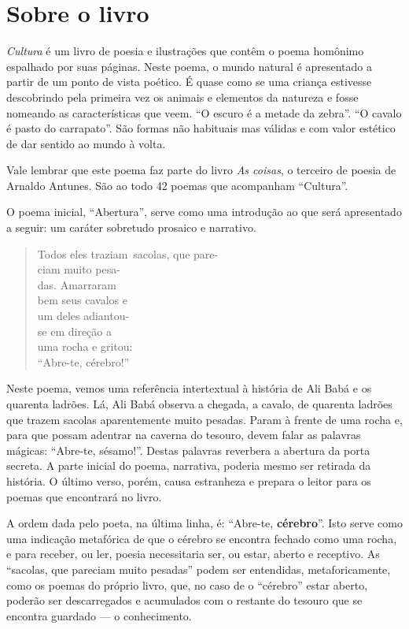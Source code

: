 \documentclass[11pt]{extarticle}
\begin{document}
\section{Sobre o livro}

\textit{Cultura} é um livro de poesia e ilustrações que contêm o 
poema homônimo espalhado por suas páginas.
Neste poema, o mundo natural é apresentado a partir de um
ponto de vista poético. É quase como se uma criança
estivesse descobrindo pela primeira vez os animais e 
elementos da natureza e fosse nomeando as características
que veem. 
``O escuro é a metade da zebra''. ``O cavalo é pasto do
carrapato''. São formas não habituais mas válidas
e com valor estético de dar sentido ao mundo à volta.

Vale lembrar que este poema faz parte do livro \textit{As coisas}, o 
terceiro de poesia de Arnaldo Antunes. 
São ao todo 42 poemas que acompanham ``Cultura''. 

O poema inicial, ``Abertura'', serve como uma introdução ao que será
apresentado a seguir: um caráter sobretudo prosaico e narrativo.

\begin{verse}
Todos eles traziam\
sacolas, que pare-\\
ciam muito pesa-\\
das. Amarraram\\
bem seus cavalos e\\
um deles adiantou-\\
se em direção a\\
uma rocha e gritou:\\
``Abre-te, cérebro!''\\
\end{verse}

Neste poema, vemos uma referência intertextual à história de Ali Babá 
e os quarenta ladrões. Lá, Ali Babá observa a chegada, a cavalo, de
quarenta ladrões que trazem sacolas aparentemente muito pesadas. 
Param à frente de uma rocha e, para que possam adentrar na caverna do tesouro, 
devem falar as palavras mágicas: ``Abre-te, sésamo!''. Destas palavras
reverbera a abertura da porta secreta. A parte inicial do poema, narrativa, 
poderia mesmo ser retirada da história. O último verso, porém, causa 
estranheza e prepara o leitor para os poemas que encontrará no livro.

A ordem dada pelo poeta, na última linha, é: ``Abre-te, \textbf{cérebro}''. Isto serve como
uma indicação metafórica de que o cérebro se encontra fechado como uma rocha, e para
receber, ou ler, poesia necessitaria ser, ou estar, aberto e receptivo.
As ``sacolas, que pareciam muito pesadas'' podem ser entendidas, metaforicamente, como os 
poemas do próprio livro, que, no caso de o ``cérebro'' estar aberto, poderão ser descarregados e
acumulados com o restante do tesouro que se encontra guardado --- o conhecimento. 
\end{document}
